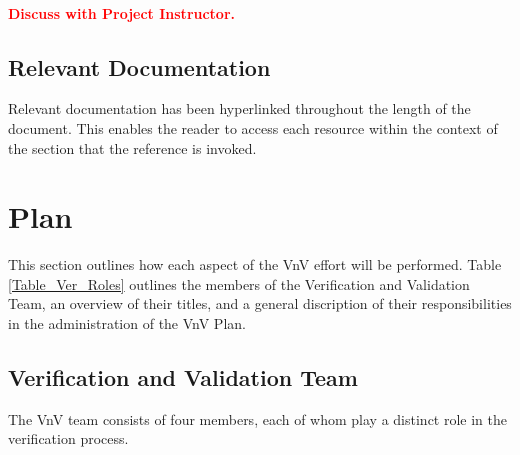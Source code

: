 \documentclass[12pt, titlepage]{article}
\begin{document}
\\
\textcolor{red}{\textbf{Discuss with Project Instructor.}}

\subsection{Relevant Documentation}

Relevant documentation has been hyperlinked throughout the length of the document. This enables 
the reader to access each resource within the context of the section that the reference is 
invoked.

\section{Plan}
This section outlines how each aspect of the VnV effort will be performed. Table \ref{Table_Ver_Roles} 
outlines the members of the Verification and Validation Team, an overview of their titles, and a 
general discription of their responsibilities in the administration of the VnV Plan. 

\subsection{Verification and Validation Team}
The VnV team consists of four members, each of whom play a distinct role in the 
verification process.\\
\end{document}
